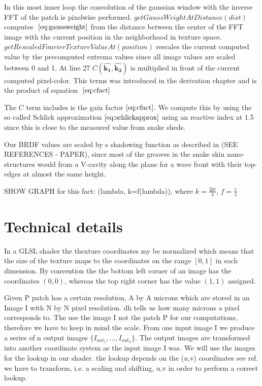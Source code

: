 In this most inner loop the convolution of the gaussian window with the inverse FFT of the patch is pixelwise performed. 
$getGaussWeightAtDistance(dist)$ computes $~\eqref{eq:gaussweight}$ from the distance between the center of the FFT image with the current position in the neighborhood in texture space. $getRescaledFourierTextureValueAt(position)$ rescales the current computed value by the precomputed extrema values since all image values are scaled between 0 and 1. At line 27 $C(\hat{\mathbf{k_1}},\hat{\mathbf{k_2}})$ is multiplied in front of the current computed pixel-color. This terms was introduced in the derivation chapter and is the product of equation $~\eqref{eq:cfact}$

The $C$ term includes is the gain factor $\ref{eq:cfact}$. We compute this by using the so called Schlick approximation $\ref{eq:schlickapprox}$ using an reactive index at 1.5 since this is close to the measured value from snake sheds.

Our BRDF values are scaled by s shadowing function as described in (SEE REFERENCES - PAPER), since most of the grooves in the snake skin nano-structures would from a V-cavity along the plane for a wave front with their top-edges at almost the same height.   

SHOW GRAPH for this fact: (lambda, k=f(lambda)), where $k = \frac{2pi}{\lambda}$, $f = \frac{c}{\lambda}$

\section{Technical details}
In a GLSL shader the thexture coordinates my be normalized which means that the size of the texture maps to the coordinates on the range $[0,1]$ in each dimension. By convention the the bottom left corner of an image has the coordinates $(0,0)$, whereas the top right corner has the value $(1,1)$ assigned. 

Given P patch has a certain resolution, A by A microns which are stored in an Image I with N by N pixel resolution. dh tells us how many microns a pixel corresponds to. The use the image I not the patch P for our computations, therefore we have to keep in mind the scale. From one input image I we produce a series of n output images $\{I_{out_1},...,I_{out_n}\}$. The output images are transformed into another coordinate system as the input image I was. We will use the images for the lookup in our shader. 
the lookup depends on the (u,v) coordinates see ref. we have to transform, i.e. a scaling and shifting, u,v in order to perform a correct lookup.

